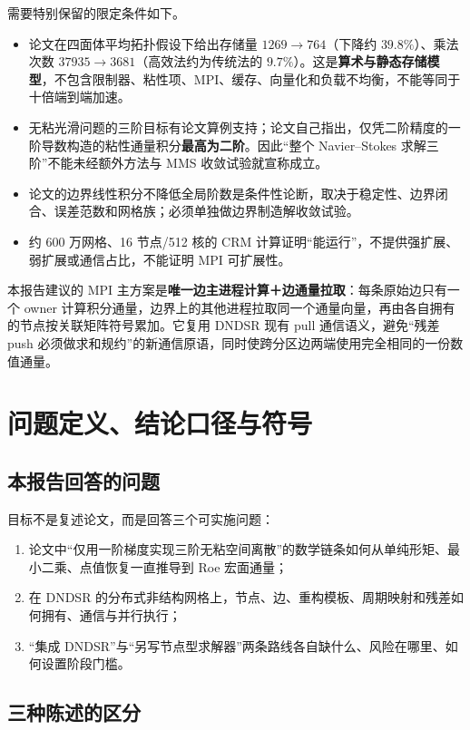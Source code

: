 \documentclass[UTF8,a4paper,11pt,openany]{ctexrep}
\numberwithin{equation}{chapter}
\begin{document}
需要特别保留的限定条件如下。

\begin{itemize}
  \item 论文在四面体平均拓扑假设下给出存储量 $1269\to764$（下降约 $39.8\%$）、乘法次数 $37935\to3681$（高效法约为传统法的 $9.7\%$）。这是\textbf{算术与静态存储模型}，不包含限制器、粘性项、MPI、缓存、向量化和负载不均衡，不能等同于十倍端到端加速。
  \item 无粘光滑问题的三阶目标有论文算例支持；论文自己指出，仅凭二阶精度的一阶导数构造的粘性通量积分\textbf{最高为二阶}。因此“整个 Navier--Stokes 求解三阶”不能未经额外方法与 MMS 收敛试验就宣称成立。
  \item 论文的边界线性积分不降低全局阶数是条件性论断，取决于稳定性、边界闭合、误差范数和网格族；必须单独做边界制造解收敛试验。
  \item 约 600 万网格、16 节点/512 核的 CRM 计算证明“能运行”，不提供强扩展、弱扩展或通信占比，不能证明 MPI 可扩展性。
\end{itemize}

本报告建议的 MPI 主方案是\textbf{唯一边主进程计算＋边通量拉取}：每条原始边只有一个 owner 计算积分通量，边界上的其他进程拉取同一个通量向量，再由各自拥有的节点按关联矩阵符号累加。它复用 DNDSR 现有 pull 通信语义，避免“残差 push 必须做求和规约”的新通信原语，同时使跨分区边两端使用完全相同的一份数值通量。

\chapter{问题定义、结论口径与符号}

\section{本报告回答的问题}

目标不是复述论文，而是回答三个可实施问题：

\begin{enumerate}
  \item 论文中“仅用一阶梯度实现三阶无粘空间离散”的数学链条如何从单纯形矩、最小二乘、点值恢复一直推导到 Roe 宏面通量；
  \item 在 DNDSR 的分布式非结构网格上，节点、边、重构模板、周期映射和残差如何拥有、通信与并行执行；
  \item “集成 DNDSR”与“另写节点型求解器”两条路线各自缺什么、风险在哪里、如何设置阶段门槛。
\end{enumerate}

\section{三种陈述的区分}
\end{document}

